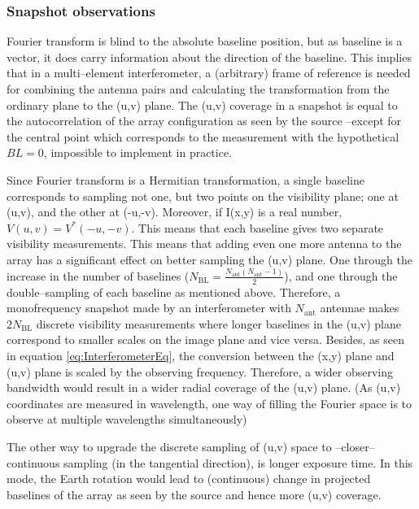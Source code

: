 \documentclass[paper=a4, fontsize=11pt]{scrartcl} %
\numberwithin{equation}{section} %
\numberwithin{figure}{section} %
\numberwithin{table}{section} %
\begin{document}
\subsubsection*{Snapshot observations}
Fourier transform is blind to the absolute baseline position, but as baseline is a vector, it does carry information about the direction of the baseline. This implies that in a multi--element interferometer, a (arbitrary) frame of reference is needed for combining the antenna pairs and calculating the transformation from the ordinary plane to the (u,v) plane. The (u,v) coverage in a snapshot is equal to the autocorrelation of the array configuration as seen by the source --except for the central point which corresponds to the measurement with the hypothetical $BL = 0$, impossible to implement in practice.

Since Fourier transform is a Hermitian transformation, a single baseline corresponds to sampling not one, but two points on the visibility plane; one at (u,v), and the other at (-u,-v). Moreover, if I(x,y) is a real number, $V(u,v) = V^*(-u,-v)$. This means that each baseline gives two separate visibility measurements. This means that adding even one more antenna to the array has a significant effect on better sampling the (u,v) plane. One through the increase in the number of baselines ($N_\mathrm{BL} = \frac{N_\mathrm{ant}(N_\mathrm{ant}-1)}{2}$), and one through the double--sampling of each baseline as mentioned above. Therefore, a monofrequency snapshot made by an interferometer with $N_\mathrm{ant}$ antennae makes $2N_\mathrm{BL}$ discrete visibility measurements where longer baselines in the (u,v) plane correspond to smaller scales on the image plane and vice versa. Besides, as seen in equation \ref{eq:InterferometerEq}, the conversion between the (x,y) plane and (u,v) plane is scaled by the observing frequency. Therefore, a wider observing bandwidth would result in a wider radial coverage of the (u,v) plane. (As (u,v) coordinates are measured in wavelength, one way of filling the Fourier space is to observe at multiple wavelengths simultaneously) 

The other way to upgrade the discrete sampling of (u,v) space to --closer-- continuous sampling (in the tangential direction), is longer exposure time. In this mode, the Earth rotation would lead to (continuous) change in projected baselines of the array as seen by the source and hence more (u,v) coverage.
\end{document}

